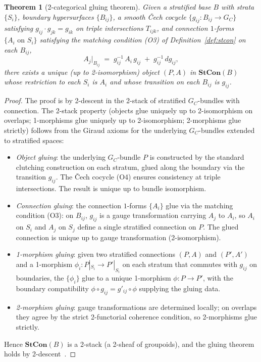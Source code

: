 \documentclass[11pt,a4paper]{article}
\theoremstyle{plain}
\newtheorem{theorem}{Theorem}[section]
\theoremstyle{definition}
\theoremstyle{remark}
\begin{document}
\begin{theorem}[2-categorical gluing theorem]
\label{thm:2cat-gluing}
Given a stratified base $B$ with strata $\{S_i\}$, boundary hypersurfaces
$\{B_{ij}\}$, a smooth Čech cocycle $\{g_{ij} : B_{ij} \to G_C\}$
satisfying $g_{ij} \cdot g_{jk} = g_{ik}$ on triple intersections
$T_{ijk}$, and connection $1$-forms $\{A_i \text{ on } S_i\}$ satisfying
the matching condition (O3) of Definition~\ref{def:stcon} on each
$B_{ij}$,
\begin{equation*}
  A_j|_{B_{ij}} \;=\; g_{ij}^{-1}\, A_i\, g_{ij} \;+\; g_{ij}^{-1}\,
  d g_{ij},
\end{equation*}
there exists a unique (up to 2-isomorphism)
object $(P, A)$ in $\mathbf{StCon}(B)$ whose restriction to each $S_i$
is $A_i$ and whose transition on each $B_{ij}$ is $g_{ij}$.
\end{theorem}

\begin{proof}
The proof is by 2-descent in the 2-stack of stratified $G_C$-bundles with
connection. The 2-stack property (objects glue uniquely up to
2-isomorphism on overlaps; 1-morphisms glue uniquely up to 2-isomorphism;
2-morphisms glue strictly) follows from the Giraud axioms for the
underlying $G_C$-bundles extended to stratified spaces:
\begin{itemize}[leftmargin=*,itemsep=2pt]
\item \emph{Object gluing}: the underlying $G_C$-bundle $P$ is constructed
  by the standard clutching construction on each stratum, glued along the
  boundary via the transition $g_{ij}$. The Čech cocycle (O4) ensures
  consistency at triple intersections. The result is unique up to
  bundle isomorphism.
\item \emph{Connection gluing}: the connection $1$-forms $\{A_i\}$ glue
  via the matching condition (O3): on $B_{ij}$, $g_{ij}$ is a gauge
  transformation carrying $A_j$ to $A_i$, so $A_i$ on $S_i$ and $A_j$
  on $S_j$ define a single stratified connection on $P$. The glued
  connection is unique up to gauge transformation (2-isomorphism).
\item \emph{1-morphism gluing}: given two stratified connections $(P, A)$
  and $(P', A')$ and a 1-morphism $\phi_i : P|_{S_i} \to P'|_{S_i}$ on
  each stratum that commutes with $g_{ij}$ on boundaries, the
  $\{\phi_i\}$ glue to a unique 1-morphism $\phi : P \to P'$, with the
  boundary compatibility $\phi \circ g_{ij} = g'_{ij} \circ \phi$
  supplying the gluing data.
\item \emph{2-morphism gluing}: gauge transformations are determined
  locally; on overlaps they agree by the strict 2-functorial coherence
  condition, so 2-morphisms glue strictly.
\end{itemize}
Hence $\mathbf{StCon}(B)$ is a 2-stack (a 2-sheaf of groupoids), and the
gluing theorem holds by 2-descent~\cite{giraud1971cohomologie,breen1994classification,breen2001gerbes,bartels2007higher}.
\end{proof}
\end{document}
